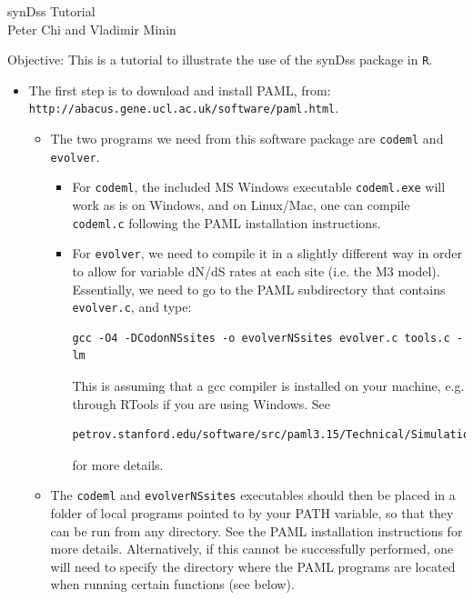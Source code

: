 \documentclass[notitlepage]{article}
\begin{document}


\begin{flushleft} 
synDss Tutorial \\
Peter Chi and Vladimir Minin \\
\end{flushleft}

Objective: This is a tutorial to illustrate the use of the synDss package in {\tt{R}}. 

\begin{itemize}
\item The first
step is to download and install PAML, from:  
{\tt{http://abacus.gene.ucl.ac.uk/software/paml.html}}. 
\begin{itemize}
\item The two programs we need
from this software package are {\tt{codeml}} and {\tt{evolver}}. 
\begin{itemize}
\item For {\tt{codeml}}, the included MS Windows executable {\tt{codeml.exe}} will work as is on Windows,
and on Linux/Mac, one can compile {\tt{codeml.c}} following the PAML installation instructions.
\item For {\tt{evolver}}, we need
to compile it in a slightly different way in order to allow for variable dN/dS rates at
each site (i.e. the M3 model). Essentially, we need to go to the PAML subdirectory that contains {\tt{evolver.c}},
and type:
\begin{verbatim}
gcc -O4 -DCodonNSsites -o evolverNSsites evolver.c tools.c -lm
\end{verbatim}
This is assuming that a gcc compiler is installed on your machine, e.g. through RTools if you are using Windows.
See 
\begin{verbatim}
petrov.stanford.edu/software/src/paml3.15/Technical/Simulation/Codon/CodonSimulation.txt
\end{verbatim} 
for more details.

\end{itemize}
\item The {\tt{codeml}} and {\tt{evolverNSsites}} executables should then be placed in a folder of 
local programs pointed to by your PATH variable,
so that they can be run from any directory. See the PAML installation instructions for more details. Alternatively,
if this cannot be successfully performed, one will need to specify the directory where the PAML programs
are located when running certain functions (see below).

\end{itemize}



\end{itemize}
\end{document}
